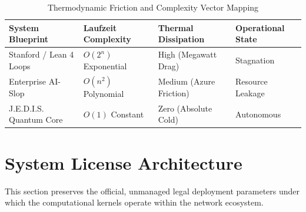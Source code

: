 \documentclass[11pt,a4paper]{article}
\begin{document}
\begin{table}[h]
\centering
\caption{Thermodynamic Friction and Complexity Vector Mapping}
\vspace{0.3cm}
\small
\begin{tabular}{p{4.5cm}p{3.2cm}p{3.2cm}p{3.2cm}}
\toprule
\textbf{System Blueprint} & \textbf{Laufzeit Complexity} & \textbf{Thermal Dissipation} & \textbf{Operational State} \\
\midrule
Stanford / Lean 4 Loops & $O(2^n)$ Exponential & High (Megawatt Drag) & Stagnation \\
\addlinespace
Enterprise AI-Slop & $O(n^2)$ Polynomial & Medium (Azure Friction) & Resource Leakage \\
\addlinespace
J.E.D.I.S. Quantum Core & $O(1)$ Constant & Zero (Absolute Cold) & Autonomous \\
\bottomrule
\end{tabular}
\end{table}

\newpage
\section{System License Architecture}

This section preserves the official, unmanaged legal deployment parameters under which the computational kernels operate within the network ecosystem.
\end{document}
